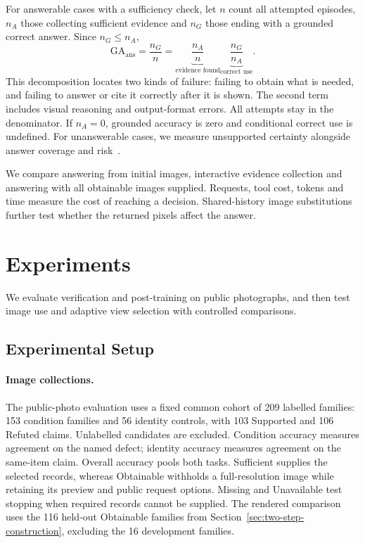 \documentclass[10pt,twocolumn,letterpaper]{article}
\begin{document}
For answerable cases with a sufficiency check, let \(n\) count all attempted episodes, \(n_A\) those collecting sufficient evidence and \(n_G\) those ending with a grounded correct answer.
Since \(n_G\le n_A\),
\begin{equation}
\mathrm{GA}_{\mathrm{ans}}
=\frac{n_G}{n}
=\underbrace{\frac{n_A}{n}}_{\text{evidence found}}
 \underbrace{\frac{n_G}{n_A}}_{\text{correct use}}.
\label{eq:decomposition}
\end{equation}
This decomposition locates two kinds of failure: failing to obtain what is needed, and failing to answer or cite it correctly after it is shown.
The second term includes visual reasoning and output-format errors.
All attempts stay in the denominator.
If \(n_A=0\), grounded accuracy is zero and conditional correct use is undefined.
For unanswerable cases, we measure unsupported certainty alongside answer coverage and risk~\cite{selective}.

We compare answering from initial images, interactive evidence collection and answering with all obtainable images supplied.
Requests, tool cost, tokens and time measure the cost of reaching a decision.
Shared-history image substitutions~\cite{countercredit} further test whether the returned pixels affect the answer.
\section{Experiments}
We evaluate verification and post-training on public photographs, and then test image use and adaptive view selection with controlled comparisons.



\subsection{Experimental Setup}
\label{sec:setup}

\paragraph{Image collections.}
The public-photo evaluation uses a fixed common cohort of 209 labelled families: 153 condition families and 56 identity controls, with 103 Supported and 106 Refuted claims.
Unlabelled candidates are excluded.
Condition accuracy measures agreement on the named defect; identity accuracy measures agreement on the same-item claim.
Overall accuracy pools both tasks.
Sufficient supplies the selected records, whereas Obtainable withholds a full-resolution image while retaining its preview and public request options.
Missing and Unavailable test stopping when required records cannot be supplied.
The rendered comparison uses the 116 held-out Obtainable families from Section~\ref{sec:two-step-construction}, excluding the 16 development families.
\end{document}
